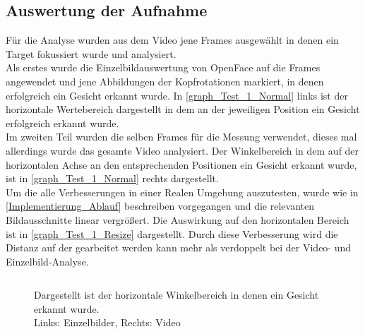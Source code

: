 \subsection{Auswertung der Aufnahme}
Für die Analyse wurden aus dem Video jene Frames ausgewählt in denen ein Target fokussiert wurde und analysiert.\\
Als erstes wurde die Einzelbildauswertung von OpenFace auf die Frames angewendet und jene Abbildungen der Kopfrotationen markiert, in denen erfolgreich ein Gesicht erkannt wurde. In \autoref{graph_Test_1_Normal} links ist der horizontale Wertebereich dargestellt in dem an der jeweiligen Position ein Gesicht erfolgreich erkannt wurde.\\
Im zweiten Teil wurden die selben Frames für die Messung verwendet, dieses mal allerdings wurde das gesamte Video analysiert. Der Winkelbereich in dem auf der horizontalen Achse an den entsprechenden Positionen ein Gesicht erkannt wurde, ist in \autoref{graph_Test_1_Normal} rechts dargestellt.\\
Um die alle Verbesserungen in einer Realen Umgebung auszutesten, wurde wie in \autoref{Implementierung_Ablauf} beschreiben vorgegangen und die relevanten Bildausschnitte linear vergrößert. Die Auswirkung auf den horizontalen Bereich ist in \autoref{graph_Test_1_Resize} dargestellt. Durch diese Verbesserung wird die Distanz auf der gearbeitet werden kann mehr als verdoppelt bei der Video- und Einzelbild-Analyse.
\begin{figure}
	\centering
	\begin{tabular}{ll}
	
	
	\end{tabular}
	\caption{Dargestellt ist der horizontale Winkelbereich in denen ein Gesicht erkannt wurde.\\
	Links: Einzelbilder, Rechts: Video}
	\label{graph_Test_1_Normal}
\end{figure}
